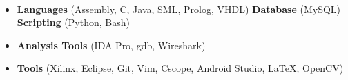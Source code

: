 \\[\lsep]

\begin{itemize}

	\itemsep-0.25em
	\item \noindent \textbf{Languages} (Assembly, C, Java, SML, Prolog, VHDL) \textbf{Database} (MySQL) \textbf{Scripting} (Python, Bash)
	\item \noindent \textbf{Analysis Tools} (IDA Pro, gdb, Wireshark)
	\item \noindent \textbf{Tools} (Xilinx, Eclipse, Git, Vim, Cscope, Android Studio, \LaTeX, OpenCV)

\end{itemize}
